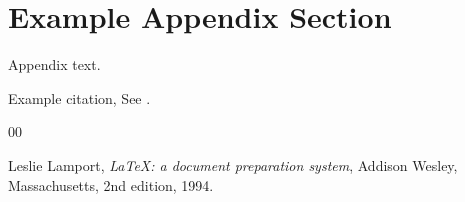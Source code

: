 \appendix
\section{Example Appendix Section}
\label{app1}

Appendix text.

Example citation, See \citet{lamport94}.




\begin{thebibliography}{00}


  Leslie Lamport,
  \textit{\LaTeX: a document preparation system},
  Addison Wesley, Massachusetts,
  2nd edition,
  1994.

\end{thebibliography}
